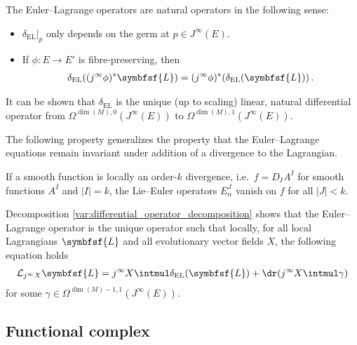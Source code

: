     \begin{property}[Naturality]
        The Euler--Lagrange operators are natural operators in the following sense:
        \begin{itemize}
            \item $\delta_{\text{EL}}|_p$ only depends on the germ at $p\in J^\infty(E)$.
            \item If $\phi:E\rightarrow E'$ is fibre-preserving, then
                \begin{gather}
                    \label{var:naturality}
                    \delta_{\text{EL}}((j^\infty\phi)^*\symbfsf{L}) = (j^\infty\phi)^*(\delta_{\text{EL}}(\symbfsf{L}))\,.
                \end{gather}
        \end{itemize}
        It can be shown that $\delta_{\text{EL}}$ is the unique (up to scaling) linear, natural differential operator from $\Omega^{\dim(M),0}(J^\infty(E))$ to $\Omega^{\dim(M),1}(J^\infty(E))$.
    \end{property}

    The following property generalizes the property that the Euler--Lagrange equations remain invariant under addition of a divergence to the Lagrangian.
    \begin{property}[Divergences]\label{var:EL_operator_divergences}
        If a smooth function is locally an order-$k$ divergence, i.e.~$f=D_IA^I$ for smooth functions $A^I$ and $|I|=k$, the Lie--Euler operators $E^J_\alpha$ vanish on $f$ for all $|J|<k$.
    \end{property}

    \begin{property}\label{var:local_variational_formula}
        Decomposition \ref{var:differential_operator_decomposition} shows that the Euler--Lagrange operator is the unique operator such that locally, for all local Lagrangians $\symbfsf{L}$ and all evolutionary vector fields $X$, the following equation holds
        \begin{gather}
            \mathcal{L}_{j^\infty X}\symbfsf{L} = j^\infty X\intmul\delta_\mathrm{EL}(\symbfsf{L}) + \dr(j^\infty X\intmul\gamma)
        \end{gather}
        for some $\gamma\in\Omega^{\dim(M)-1,1}(J^\infty(E))$.
    \end{property}

\subsection{Functional complex}

